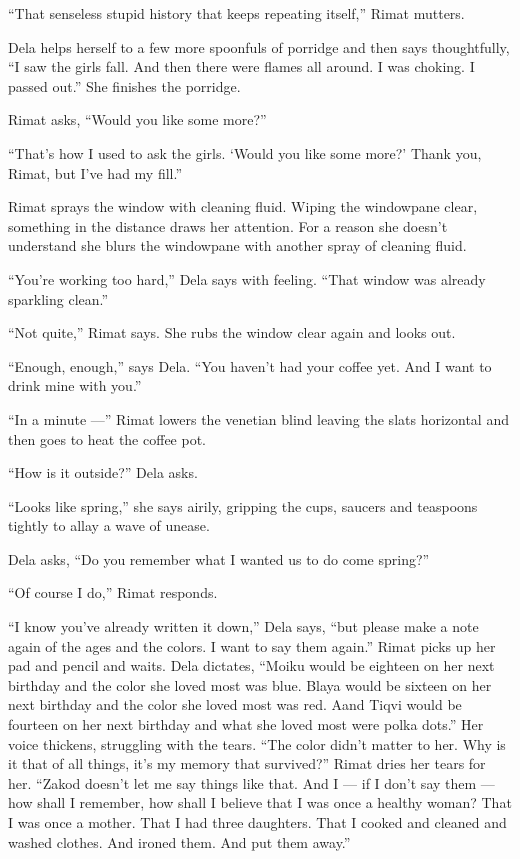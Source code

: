 \documentclass[twoside,11pt,openany]{book}
\begin{document}
``That senseless stupid history that keeps repeating itself,'' Rimat mutters.

Dela helps herself to a few more spoonfuls of porridge and then says thoughtfully, ``I saw the girls fall.
And then there were flames all around. I was choking. I passed out.'' She finishes the porridge.

Rimat asks, ``Would you like some more?''

``That's how I used to ask the girls. `Would you like some more?' Thank you, Rimat, but I've had my
fill.''

Rimat sprays the window with cleaning fluid. Wiping the windowpane clear, something{ }in the distance
draws her attention. For a reason she doesn't understand she blurs the windowpane with another spray of cleaning fluid.


``You're working too hard,'' Dela says with feeling. ``That window was already
sparkling clean.''

``Not quite,'' Rimat says. She rubs the window clear again and looks out.

``Enough, enough,'' says Dela. ``You haven't had your coffee yet.
And{ }I want to drink mine with you.''

``In a minute ---'' Rimat lowers the venetian blind leaving the slats horizontal and then goes
to heat the coffee pot.

``How is it outside?'' Dela asks.

``Looks like spring,'' she says airily, gripping the cups, saucers and teaspoons tightly to
allay a wave of unease.

Dela asks, ``Do you remember what I wanted us to do come spring?''

``Of course I do,'' Rimat responds.

``I know you've already written it down,'' Dela says, ``but please make a note again of the ages and the
colors.  I want to say them again.'' Rimat picks up her pad and pencil and waits. Dela dictates,
``Moiku would be eighteen on her next birthday and the color she loved most was blue. Blaya would be
sixteen on her next birthday and the color she loved most was red. Aand Tiqvi would be fourteen on her next birthday
and what she loved most were polka dots.'' Her voice thickens, struggling with the tears.
``The color didn't matter to her. Why is it that of all things, it's my memory that
survived?'' Rimat dries her tears for her. ``Zakod doesn't let me say things like that. And I
--- if I don't say them --- how shall I remember, how shall I believe that I was once a healthy woman? That I was once a
mother. That I had three daughters. That I cooked and cleaned and washed clothes. And ironed them. And put them
away.''
\end{document}

